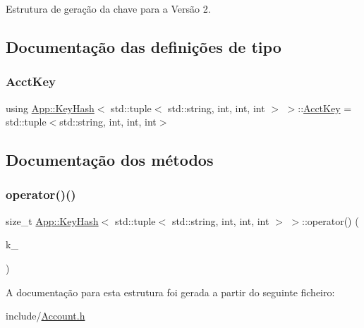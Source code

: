 Estrutura de geração da chave para a Versão 2. 

\subsection{Documentação das definições de tipo}
\mbox{\label{structApp_1_1KeyHash_3_01std_1_1tuple_3_01std_1_1string_00_01int_00_01int_00_01int_01_4_01_4_a5ee36243fff70535c7d1831746625885}} 
\subsubsection{\texorpdfstring{Acct\+Key}{AcctKey}}
{\footnotesize\ttfamily using \hyperlink{structApp_1_1KeyHash}{App\+::\+Key\+Hash}$<$ std\+::tuple$<$ std\+::string, int, int, int $>$ $>$\+::\hyperlink{structApp_1_1KeyHash_3_01std_1_1tuple_3_01std_1_1string_00_01int_00_01int_00_01int_01_4_01_4_a5ee36243fff70535c7d1831746625885}{Acct\+Key} =  std\+::tuple$<$std\+::string, int, int, int$>$}



\subsection{Documentação dos métodos}
\mbox{\label{structApp_1_1KeyHash_3_01std_1_1tuple_3_01std_1_1string_00_01int_00_01int_00_01int_01_4_01_4_ab9c9cb7c1f627f6f991d31e8e6e0b8c8}} 
\subsubsection{\texorpdfstring{operator()()}{operator()()}}
{\footnotesize\ttfamily size\+\_\+t \hyperlink{structApp_1_1KeyHash}{App\+::\+Key\+Hash}$<$ std\+::tuple$<$ std\+::string, int, int, int $>$ $>$\+::operator() (\begin{DoxyParamCaption}\item[{const \hyperlink{structApp_1_1KeyHash_3_01std_1_1tuple_3_01std_1_1string_00_01int_00_01int_00_01int_01_4_01_4_a5ee36243fff70535c7d1831746625885}{Acct\+Key} \&}]{k\+\_\+ }\end{DoxyParamCaption})\hspace{0.3cm}{\ttfamily [inline]}}



A documentação para esta estrutura foi gerada a partir do seguinte ficheiro\+:\begin{DoxyCompactItemize}
\item 
include/\hyperlink{Account_8h}{Account.\+h}\end{DoxyCompactItemize}
